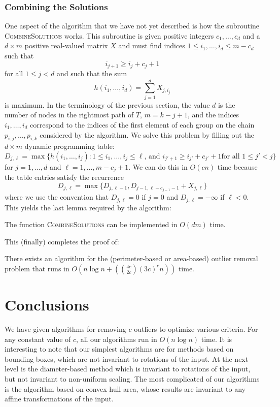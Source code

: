 \documentclass[lotsofwhite]{patmorin}
\newcommand{\runtime}{n\log n + \left({4c\choose 2c}(3c)^cn\right)}
\newcommand{\Oruntime}{O\left(\runtime\right)}
\begin{document}
\subsubsection{Combining the Solutions}

One aspect of the algorithm that we have not yet described is how the
subroutine \textsc{CombineSolutions} works.  This subroutine is given
positive integers $c_1,\ldots,c_d$ and a $d\times m$ positive
real-valued matrix $X$ and must find 
indices $1\le i_1,\ldots,i_d \le m-c_d$ such that
\[
     i_{j+1} \ge i_j + c_j + 1
\]
for all $1\le j < d$ and such that the sum
\[
      h(i_1,\ldots,i_d)=\sum_{j=1}^d X_{j,i_j}
\]
is maximum.  In the terminology of the previous section, the value $d$
is the number of nodes in the rightmost path of $T$, $m=k-j+1$, and
the indices
$i_1,\ldots,i_d$ correspond to the indices of the
first element of each group on the chain $p_{i,j},\ldots,p_{i,k}$
considered by the algorithm.
We solve this problem by filling out the $d\times m$ dynamic
programming table:
\[
     D_{j,\ell} = \max\{h(i_1,\ldots,i_j):
      \mbox{$1\le i_1,\ldots,i_j\le \ell$, and $i_{j'+1} \ge i_{j'}+c_{j'}+1$
             for all $1\le j'< j$}  \} 
\]
for $j=1,\ldots,d$ and $\ell=1,\ldots,m-c_j+1$.  We can do this in
$O(cn)$ time because the table entries satisfy the recurrence
\[
     D_{j,\ell} = \max\{D_{j,\ell-1},D_{j-1,\ell-c_{j-1}-1}+X_{j,\ell} \}
\]
where we use the convention that $D_{j,\ell} = 0$ if $j=0$ and
$D_{j,\ell}=-\infty$ if $\ell<0$.  This yields the last lemma required
by the algorithm:

\begin{lem}
The function \textsc{CombineSolutions} can be implemented in
$O(dm)$ time.
\end{lem}

This (finally) completes the proof of:
\begin{thm}
There exists an algorithm for the
(perimeter-based or area-based) outlier removal problem that runs in
$\Oruntime$ time.
\end{thm}

\section{Conclusions}

We have given algorithms for removing $c$ outliers to optimize various
criteria. For any constant value of $c$, all our algorithms run in
$O(n\log n)$ time.  It is interesting to note that our simplest
algorithms are for methods based on bounding boxes, which are not
invariant to rotations of the input.  At the next level is the
diameter-based method which is invariant to rotations of the input,
but not invariant to non-uniform scaling.  The most complicated of our
algorithms is the algorithm based on convex hull area, whose results
are invariant to any affine transformations of the input.
\end{document}
